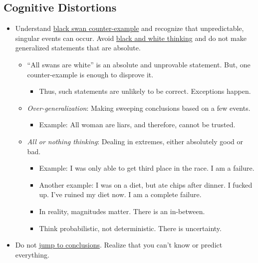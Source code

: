 \documentclass[
]{book}
\providecommand{\tightlist}{%
  \setlength{\itemsep}{0pt}\setlength{\parskip}{0pt}}
\begin{document}
\hypertarget{cognitive-distortions}{%
\subsection{Cognitive Distortions}\label{cognitive-distortions}}

\begin{itemize}
\tightlist
\item
  Understand \href{https://en.wikipedia.org/wiki/Black_swan_theory}{black swan counter-example} and recognize that unpredictable, singular events can occur. Avoid \href{https://en.wikipedia.org/wiki/Splitting_(psychology)}{black and white thinking} and do not make generalized statements that are absolute.

  \begin{itemize}
  \tightlist
  \item
    ``All swans are white'' is an absolute and unprovable statement. But, one counter-example is enough to disprove it.

    \begin{itemize}
    \tightlist
    \item
      Thus, such statements are unlikely to be correct. Exceptions happen.
    \end{itemize}
  \item
    \emph{Over-generalization}: Making sweeping conclusions based on a few events.

    \begin{itemize}
    \tightlist
    \item
      Example: All woman are liars, and therefore, cannot be trusted.
    \end{itemize}
  \item
    \emph{All or nothing thinking}: Dealing in extremes, either absolutely good or bad.

    \begin{itemize}
    \tightlist
    \item
      Example: I was only able to get third place in the race. I am a failure.
    \item
      Another example: I was on a diet, but ate chips after dinner. I fucked up. I've ruined my diet now. I am a complete failure.
    \item
      In reality, magnitudes matter. There is an in-between.
    \item
      Think probabilistic, not deterministic. There is uncertainty.
    \end{itemize}
  \end{itemize}
\item
  Do not \href{https://en.wikipedia.org/wiki/Jumping_to_conclusions}{jump to conclusions}. Realize that you can't know or predict everything.


\end{itemize}
\end{document}
